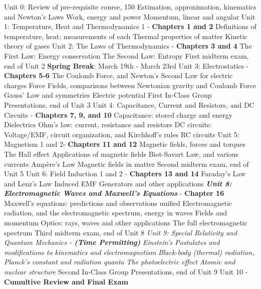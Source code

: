 \documentclass[10pt]{article}
\begin{document}
\begin{outline}[enumerate]
\1 Unit 0: Review of pre-requisite course, 150
\2 Estimation, approximation, kinematics and Newton's Laws
\2 Work, energy and power
\2 Momentum, linear and angular
\1 Unit 1: Temperature, Heat and Thermodynamics 1 - \textbf{Chapters 1 and 2}
\2 Definitions of temperature, heat; measurements of each
\2 Thermal properties of matter
\2 Kinetic theory of gases
\1 Unit 2: The Laws of Thermodynamics - \textbf{Chapters 3 and 4}
\2 The First Law: Energy conservation 
\2 The Second Law: Entropy
\1 First midterm exam, end of Unit 2
\1 \textbf{Spring Break}: March 19th - March 23rd
\1 Unit 3: Electrostatics - \textbf{Chapters 5-6}
\2 The Coulomb Force, and Newton's Second Law for electric charges
\2 Force Fields, comparisons between Newtonian gravity and Coulomb Force
\2 Gauss' Law and symmetries
\2 Electric potential
\1 First In-Class Group Presentations, end of Unit 3
\1 Unit 4: Capacitance, Current and Resistors, and DC Circuits - \textbf{Chapters 7, 9, and 10}
\2 Capacitance: stored charge and energy
\2 Dielectrics
\2 Ohm's law: current, resistance and resistors
\2 DC circuits: Voltage/EMF, circuit organization, and Kirchhoff's rules
\2 RC circuits
\1 Unit 5: Magnetism 1 and 2- \textbf{Chapters 11 and 12}
\2 Magnetic fields, forces and torques
\2 The Hall effect
\2 Applications of magnetic fields
\2 Biot-Savart Law, and various currents
\2 Amp\`{e}re's Law
\2 Magnetic fields in matter
\1 Second midterm exam, end of Unit 5
\1 Unit 6: Field Induction 1 and 2 - \textbf{Chapters 13 and 14}
\2 Faraday's Law and Lenz's Law
\2 Induced EMF
\2 Generators and other applications
\1 \textit{\textbf{ Unit 8: Electromagnetic Waves and Maxwell's Equations}} - \textbf{Chapter 16}
\2 Maxwell's equations: predictions and observations unified
\2 Electromagnetic radiation, and the electromagnetic spectrum, energy in waves
\2 Fields and momentum
\2 Optics: rays, waves and other applications
\2 The full electromagnetic spectrum
\1 Third midterm exam, end of Unit 8
\1 \textit{Unit 9: Special Relativity and Quantum Mechanics - \textbf{(Time Permitting)}}
\2 \textit{Einstein's Postulates and modifications to kinematics and electromagnetism}
\2 \textit{Black-body (thermal) radiation, Planck's constant and radiation quanta}
\2 \textit{The photoelectric effect}
\2 \textit{Atomic and nuclear structure}
\1 Second In-Class Group Presentations, end of Unit 9
\1 Unit 10 - \textbf{Cumultive Review and Final Exam}
\end{outline}
\end{document}
